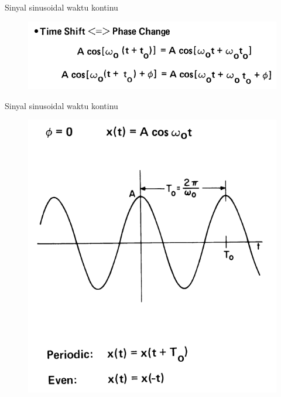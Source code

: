 \documentclass[pdflatex,compress,mathserif]{beamer}
\begin{document}
\begin{frame}{Sinyal sinusoidal waktu kontinu}
	\begin{figure}
		\centering
		\includegraphics[width=\linewidth]{img/01.slide_02_02}
	\end{figure}
\end{frame}

\begin{frame}{Sinyal sinusoidal waktu kontinu}
	\begin{figure}
		\centering
		\includegraphics[height=0.8\textheight]{img/01.slide_03}
	\end{figure}
\end{frame}
\end{document}
